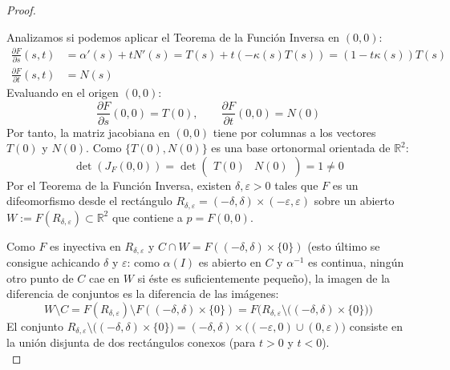 \begin{lema}
\begin{proof}
\begin{figure}[H]
\begin{subfigure}[b]{0.30\textwidth}
            \end{subfigure}%
        \end{figure}
        
        Analizamos si podemos aplicar el Teorema de la Función Inversa en $(0,0)$:
        \begin{align*}
            \frac{\partial F}{\partial s}(s,t) &= \alpha'(s) + t N'(s) = T(s) + t(-\kappa(s)T(s)) = (1 - t\kappa(s)) T(s) \\[0.8em]
            \frac{\partial F}{\partial t}(s,t) &= N(s)
        \end{align*}
        Evaluando en el origen $(0,0)$:
        \[
        \frac{\partial F}{\partial s}(0,0) = T(0), \qquad \frac{\partial F}{\partial t}(0,0) = N(0)
        \]
        Por tanto, la matriz jacobiana en $(0,0)$ tiene por columnas a los vectores $T(0)$ y $N(0)$. Como $\{T(0), N(0)\}$ es una base ortonormal orientada de $\mathbb{R}^2$:
        \[
        \det(J_F(0,0)) = \det \begin{pmatrix} T(0) & N(0) \end{pmatrix} = 1 \neq 0
        \]
        Por el Teorema de la Función Inversa, existen $\delta, \varepsilon > 0$ tales que $F$ es un difeomorfismo desde el rectángulo $R_{\delta,\varepsilon} = (-\delta, \delta) \times (-\varepsilon, \varepsilon)$ sobre un abierto $W := F(R_{\delta,\varepsilon}) \subset \mathbb{R}^2$ que contiene a $p = F(0,0)$.

        Como $F$ es inyectiva en $R_{\delta,\varepsilon}$ y $C \cap W = F((-\delta, \delta) \times \{0\})$ (esto último se consigue achicando $\delta$ y $\varepsilon$: como $\alpha(I)$ es abierto en $C$ y $\alpha^{-1}$ es continua, ningún otro punto de $C$ cae en $W$ si éste es suficientemente pequeño), la imagen de la diferencia de conjuntos es la diferencia de las imágenes:
        \[
        W \setminus C = F(R_{\delta,\varepsilon}) \setminus F((-\delta, \delta) \times \{0\}) = F\Big( R_{\delta,\varepsilon} \setminus \big((-\delta, \delta) \times \{0\}\big) \Big)
        \]
        El conjunto $R_{\delta,\varepsilon} \setminus \big((-\delta, \delta) \times \{0\}\big) = (-\delta, \delta) \times \Big((-\varepsilon, 0) \cup (0, \varepsilon)\Big)$ consiste en la unión disjunta de dos rectángulos conexos (para $t > 0$ y $t < 0$).\\


\end{proof}
\end{lema}
